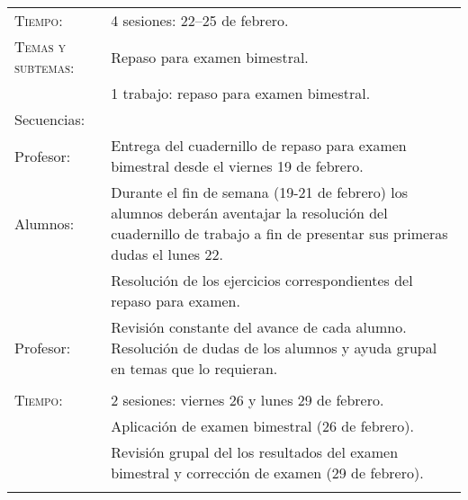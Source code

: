 \documentclass[letterpaper,10pt]{article}
\begin{document}
\begin{tabular}[t]{R{0.25\textwidth}p{0.71\textwidth}}

    \textsc{Tiempo:}           & 4 sesiones: 22--25  de febrero. \\
    \textsc{Temas y subtemas:} & Repaso para examen bimestral. \\
     & 1 trabajo: repaso para examen bimestral. \\
    \large{\sc Secuencias:} \\
    Profesor:   & Entrega del cuadernillo de repaso para examen bimestral desde
    el viernes 19 de febrero. \\
    Alumnos:    & Durante el fin de semana (19-21 de febrero) los alumnos 
    deber\'an aventajar la resoluci\'on del cuadernillo de trabajo a fin de 
    presentar sus primeras dudas el lunes 22. \\ & Resoluci\'on de los 
    ejercicios correspondientes del repaso para examen. \\
    Profesor:   & Revisi\'on constante del avance de cada alumno. Resoluci\'on 
    de dudas de los alumnos y ayuda grupal en temas que lo requieran. 
\\ \hline \\

    \textsc{Tiempo:}& 2 sesiones: viernes 26 y lunes 29  de febrero. \\
            & {\Large \sc Aplicaci\'on de examen bimestral} (26 de febrero). \\           
            & Revisi\'on grupal del los resultados del examen bimestral y
            correcci\'on de examen (29 de febrero).\\
\\ \hline


\end{tabular}
\end{document}
